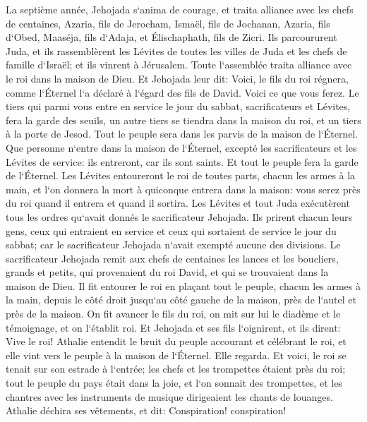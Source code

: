 \verse La septième année, Jehojada s`anima de courage, et traita alliance avec les chefs de centaines, Azaria, fils de Jerocham, Ismaël, fils de Jochanan, Azaria, fils d`Obed, Maaséja, fils d`Adaja, et Élischaphath, fils de Zicri. 
\verse Ils parcoururent Juda, et ils rassemblèrent les Lévites de toutes les villes de Juda et les chefs de famille d`Israël; et ils vinrent à Jérusalem. 
\verse Toute l`assemblée traita alliance avec le roi dans la maison de Dieu. Et Jehojada leur dit: Voici, le fils du roi régnera, comme l`Éternel l`a déclaré à l`égard des fils de David. 
\verse Voici ce que vous ferez. Le tiers qui parmi vous entre en service le jour du sabbat, sacrificateurs et Lévites, fera la garde des seuils, 
\verse un autre tiers se tiendra dans la maison du roi, et un tiers à la porte de Jesod. Tout le peuple sera dans les parvis de la maison de l`Éternel. 
\verse Que personne n`entre dans la maison de l`Éternel, excepté les sacrificateurs et les Lévites de service: ils entreront, car ils sont saints. Et tout le peuple fera la garde de l`Éternel. 
\verse Les Lévites entoureront le roi de toutes parts, chacun les armes à la main, et l`on donnera la mort à quiconque entrera dans la maison: vous serez près du roi quand il entrera et quand il sortira. 
\verse Les Lévites et tout Juda exécutèrent tous les ordres qu`avait donnés le sacrificateur Jehojada. Ils prirent chacun leurs gens, ceux qui entraient en service et ceux qui sortaient de service le jour du sabbat; car le sacrificateur Jehojada n`avait exempté aucune des divisions. 
\verse Le sacrificateur Jehojada remit aux chefs de centaines les lances et les boucliers, grands et petits, qui provenaient du roi David, et qui se trouvaient dans la maison de Dieu. 
\verse Il fit entourer le roi en plaçant tout le peuple, chacun les armes à la main, depuis le côté droit jusqu`au côté gauche de la maison, près de l`autel et près de la maison. 
\verse On fit avancer le fils du roi, on mit sur lui le diadème et le témoignage, et on l`établit roi. Et Jehojada et ses fils l`oignirent, et ils dirent: Vive le roi! 
\verse Athalie entendit le bruit du peuple accourant et célébrant le roi, et elle vint vers le peuple à la maison de l`Éternel. 
\verse Elle regarda. Et voici, le roi se tenait sur son estrade à l`entrée; les chefs et les trompettes étaient près du roi; tout le peuple du pays était dans la joie, et l`on sonnait des trompettes, et les chantres avec les instruments de musique dirigeaient les chants de louanges. Athalie déchira ses vêtements, et dit: Conspiration! conspiration! 
